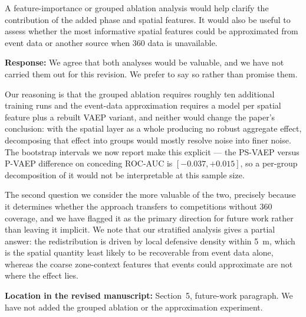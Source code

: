 \documentclass[11pt,a4paper]{article}
\newcommand{\response}[2]{%
  \begin{responsebox}
  \textbf{Response:}
  #1
  \end{responsebox}
  \begin{locationbox}
  \textbf{Location in the revised manuscript:}
  #2
  \end{locationbox}
}
\begin{document}
\begin{reviewbox}
A feature-importance or grouped ablation analysis would help clarify the contribution of the added phase and spatial features. It would also be useful to assess whether the most informative spatial features could be approximated from event data or another source when 360 data is unavailable.
\end{reviewbox}
\response{We agree that both analyses would be valuable, and we have not carried them out for this revision. We prefer to say so rather than promise them.

Our reasoning is that the grouped ablation requires roughly ten additional training runs and the event-data approximation requires a model per spatial feature plus a rebuilt VAEP variant, and neither would change the paper's conclusion: with the spatial layer as a whole producing no robust aggregate effect, decomposing that effect into groups would mostly resolve noise into finer noise. The bootstrap intervals we now report make this explicit --- the PS-VAEP versus P-VAEP difference on conceding ROC-AUC is $[-0.037, +0.015]$, so a per-group decomposition of it would not be interpretable at this sample size.

The second question we consider the more valuable of the two, precisely because it determines whether the approach transfers to competitions without 360 coverage, and we have flagged it as the primary direction for future work rather than leaving it implicit. We note that our stratified analysis gives a partial answer: the redistribution is driven by local defensive density within 5~m, which is the spatial quantity least likely to be recoverable from event data alone, whereas the coarse zone-context features that events could approximate are not where the effect lies.}{Section~5, future-work paragraph. We have not added the grouped ablation or the approximation experiment.}
\end{document}
